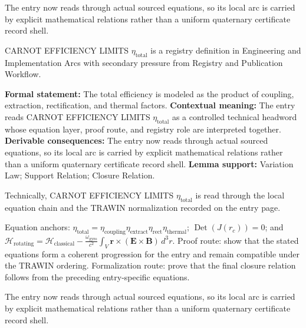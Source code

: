 The entry now reads through actual sourced equations, so its local arc is carried by explicit mathematical relations rather than a uniform quaternary certificate record shell.
\clearpage


\begingroup\small
{}
CARNOT EFFICIENCY LIMITS \(\eta_{\mathrm{total}}\) is a registry definition in Engineering and Implementation Arcs with secondary pressure from Registry and Publication Workflow.

\begingroup\footnotesize\setlength{\emergencystretch}{3em}\sloppy
\textbf{Formal statement:} The total efficiency is modeled as the product of coupling, extraction, rectification, and thermal factors. \textbf{Contextual meaning:} The entry reads CARNOT EFFICIENCY LIMITS \(\eta_{\mathrm{total}}\) as a controlled technical headword whose equation layer, proof route, and registry role are interpreted together. \textbf{Derivable consequences:} The entry now reads through actual sourced equations, so its local arc is carried by explicit mathematical relations rather than a uniform quaternary certificate record shell. \textbf{Lemma support:} Variation Law; Support Relation; Closure Relation.\par
\endgroup

Technically, CARNOT EFFICIENCY LIMITS \(\eta_{\mathrm{total}}\) is read through the local equation chain and the TRAWIN normalization recorded on the entry page.

Equation anchors: \(\eta_{\mathrm{total}}=\eta_{\mathrm{coupling}}\eta_{\mathrm{extract}}\eta_{\mathrm{rect}}\eta_{\mathrm{thermal}}\); \(\operatorname{Det}(J(r_c))=0\); and \(\mathcal{H}_{\mathrm{rotating}}=\mathcal{H}_{\mathrm{classical}}-\frac{\omega_{\mathrm{gyro}}}{c^2}\int_V\mathbf{r}\times(\mathbf{E}\times\mathbf{B})\,d^3r\). Proof route: show that the stated equations form a coherent progression for the entry and remain compatible under the TRAWIN ordering. Formalization route: prove that the final closure relation follows from the preceding entry-specific equations.

The entry now reads through actual sourced equations, so its local arc is carried by explicit mathematical relations rather than a uniform quaternary certificate record shell.
\endgroup

